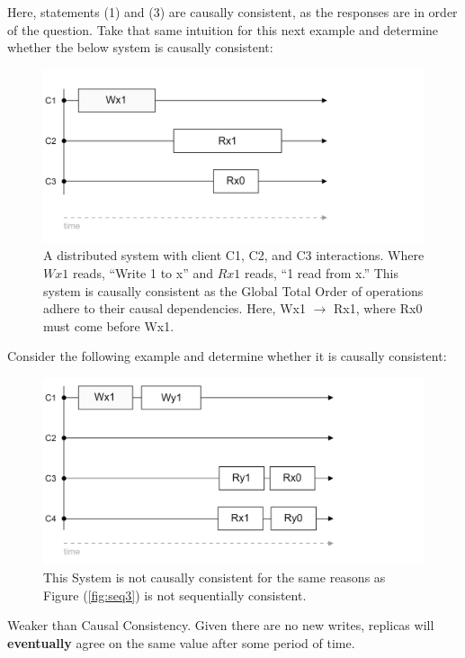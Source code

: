 \noindent
Here, statements (1) and (3) are causally consistent, as the responses are in order of the question. Take 
that same intuition for this next example and determine whether the below system is causally consistent:

\begin{figure}[h]
    \centering
    \includegraphics[width=.9\textwidth]{Sections/consist/cas1.png}
    \caption{A distributed system with client C1, C2, and C3 interactions. Where $Wx1$ reads, ``Write 1 to x'' and $Rx1$ reads, ``1 read from x.'' This 
    system is causally consistent as the Global Total Order of operations adhere to their causal dependencies. Here, Wx1 $\rightarrow$ Rx1, where Rx0 must come before Wx1.}
\end{figure}

\newpage 

\noindent
Consider the following example and determine whether it is causally consistent:
\begin{figure}[h] 
    \centering
    \includegraphics[width=.9\textwidth]{Sections/consist/seq3.png}
    \caption{This 
    System is not causally consistent for the same reasons as Figure (\ref{fig:seq3}) is not sequentially consistent.}
\end{figure}

\begin{Def}
    
    Weaker than Causal Consistency. Given there are no new writes, replicas will \textbf{eventually} agree on the same value 
    after some period of time.
\end{Def}


